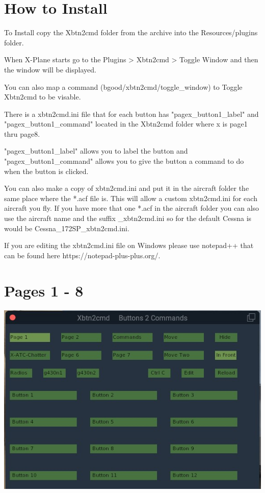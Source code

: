 \documentclass[11pt,parskip=half,a4paper]{scrartcl}
\begin{document}
\section{How to Install}
To Install copy the Xbtn2cmd folder from the archive into the Resources/plugins folder. \newline

When X-Plane starts go to the Plugins > Xbtn2cmd > Toggle Window and then the window will be displayed. \newline

You can also map a command (bgood/xbtn2cmd/toggle\_window) to Toggle Xbtn2cmd to be visable. \newline

There is a xbtn2cmd.ini file that for each button has "pagex\_button1\_label" and "pagex\_button1\_command" located in the Xbtn2cmd folder where x is page1 thru page8. \newline

"pagex\_button1\_label" allows you to label the button and "pagex\_button1\_command" allows you to give the button a command to do when the button is clicked. \newline

You can also make a copy of xbtn2cmd.ini and put it in the aircraft folder the same place where the *.acf file is. This will allow a custom xbtn2cmd.ini for each aircraft you fly. If you have more that one *.acf in the aircraft folder you can also use the aircraft name and the suffix \_xbtn2cmd.ini so for the default Cessna is would be Cessna\_172SP\_xbtn2cmd.ini. \newline

If you are editing the xbtn2cmd.ini file on Windows please use notepad++ that can be found here https://notepad-plus-plus.org/.

\section{Pages 1 - 8}

\begin{center}
\includegraphics[width=15cm]{../pics/Xbtn2cmd_Page1.jpg}
\end{center}
\end{document}
